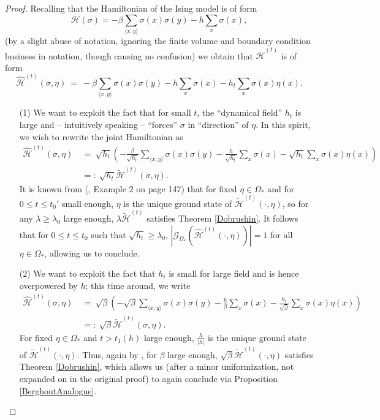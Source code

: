 \documentclass[12pt]{article}
\newcommand{\G}{\mathcal{G}}
\renewcommand{\H}{\mathcal{H}}
\newcommand{\oklepaj}[1]{\left(#1\right)}
\newcommand{\pika}{\boldsymbol{\cdot}}
\newcommand{\1}{\mathbbm{1}}
\renewcommand{\sp}[1]{\langle #1\rangle}
\newcommand{\5}{\vspace{0.5cm}}
\renewcommand{\tilde}{\widetilde}
\renewcommand{\hat}{\widehat}
\theoremstyle{definition}
\begin{document}
\begin{proof}
Recalling that the Hamiltonian of the Ising model is of form 
$$\H(\sigma)=-\beta\sum_{\sp{x,y}}\sigma(x)\sigma(y)-h\sum_{x}\sigma(x),$$ 
(by a slight abuse of notation, ignoring the finite volume and boundary condition business in notation, though causing no confusion) we obtain that $\hat{\H}^{(t)}$ is of form
$$\hat{\H}^{(t)}(\sigma,\eta) ~=~ -\beta\sum_{\sp{x,y}}\sigma(x)\sigma(y)-h\sum_{x}\sigma(x) - h_t\sum_x \sigma(x)\eta(x).$$
\begin{itemize}
	\item[(1)] We want to exploit the fact that for small $t$, the ``dynamical field'' $h_t$ is large and -- intuitively speaking -- ``forces'' $\sigma$ in ``direction'' of $\eta$. In this spirit, we wish to rewrite the joint Hamiltonian as
\begin{align*}
\hat{\H}^{(t)}(\sigma,\eta) ~&=~ \sqrt{h_t}\oklepaj{-\frac{\beta}{\sqrt{h_t}}\sum_{\sp{x,y}}\sigma(x)\sigma(y)-\frac{h}{\sqrt{h_t}}\sum_{x}\sigma(x)-\sqrt{h_t}\sum_{x}\sigma(x)\eta(x)} \\
&=:~ \sqrt{h_t}\tilde{\H}^{(t)}(\sigma,\eta).
\end{align*}
It is known from (\cite{Geo}, Example 2 on page 147) that for fixed $\eta\in\Omega_*$ and for $0\leq t\leq t_0'$ small enough, $\eta$ is the unique ground state of $\tilde{\H}^{(t)}(\pika,\eta)$, so for any $\lambda\geq\lambda_0$ large enough, $\lambda\tilde{\H}^{(t)}$ satisfies Theorem \ref{Dobrushin}. It follows that for $0\leq t\leq t_0$ such that $\sqrt{h_t}\geq \lambda_0$, $|\G_{\Omega_*}(\hat{\H}^{(t)}(\pika,\eta))|=1$ for all $\eta\in\Omega_*$, allowing us to conclude.
	\item[(2)] We want to exploit the fact that $h_t$ is small for large field and is hence overpowered by $h$; this time around, we write
\begin{align*}
\hat{\H}^{(t)}(\sigma,\eta) ~&=~ \sqrt{\beta}\oklepaj{-\sqrt{\beta}\sum_{\sp{x,y}}\sigma(x)\sigma(y)-\frac{h}{\beta}\sum_{x}\sigma(x)-\frac{h_t}{\sqrt{\beta}}\sum_{x}\sigma(x)\eta(x)} \\
&=:~ \sqrt{\beta}\tilde{\H}^{(t)}(\sigma,\eta).
\end{align*}
For fixed $\eta\in\Omega_*$ and $t>t_1(h)$ large enough, $\frac{h}{|h|}$ is the unique ground state of $\tilde{\H}^{(t)}(\pika,\eta)$. Thus, again by \cite{Geo}, for $\beta$ large enough, $\sqrt{\beta}\tilde{\H}^{(t)}(\pika,\eta)$ satisfies Theorem \ref{Dobrushin}, which allows us (after a minor uniformization, not expanded on in the original proof) to again conclude via Proposition \ref{BerghoutAnalogue}.
\end{itemize}
\end{proof}
\end{document}
